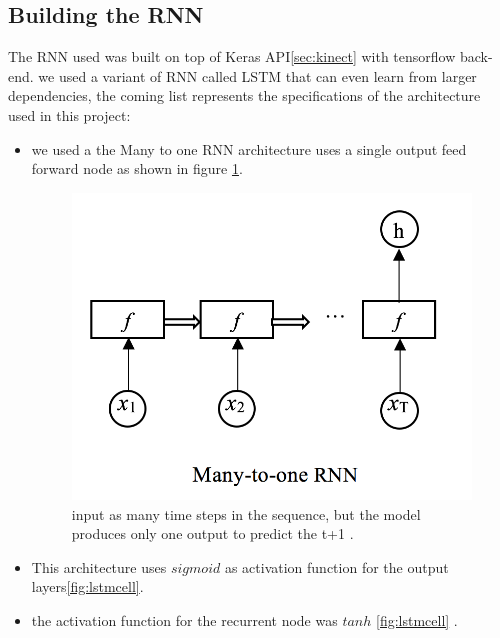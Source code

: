 \subsection{Building the RNN}
The RNN used was built on top of Keras API\ref{sec:kinect} with tensorflow  back-end. we used a variant of RNN called LSTM  that can even learn from larger dependencies, the coming list represents the specifications of the architecture used in this project:
\begin{itemize}
\item we used a the Many to one RNN architecture  uses a single output feed forward node as shown in figure \ref{fig:manyto_one}.

\begin{figure}[H]
\centering
\includegraphics[scale=.3]{img/many_to_one.png} 
\caption{input as many time steps in the sequence, but the model produces only one output to predict the t+1 .}
\label{fig:manyto_one}
\end{figure}

    \item This architecture uses  $sigmoid$  as activation function for the output layers\ref{fig:lstmcell}.
    \item the activation function for the recurrent node was $tanh$ \ref{fig:lstmcell} .
\end{itemize}

